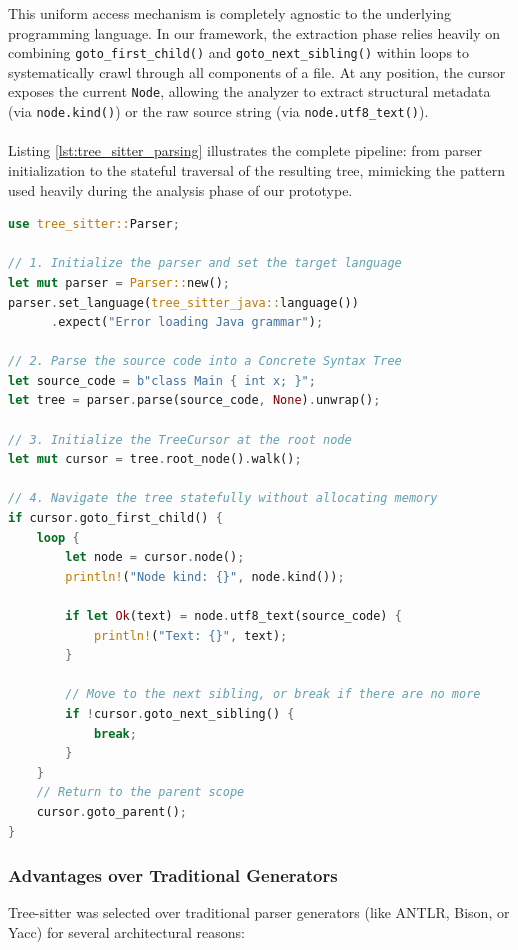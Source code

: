 This uniform access mechanism is completely agnostic to the underlying
programming language. In our framework, the extraction phase relies
heavily on combining \texttt{goto\_first\_child()} and
\texttt{goto\_next\_sibling()} within loops to systematically crawl
through all components of a file. At any position, the cursor exposes
the current \texttt{Node}, allowing the analyzer to extract structural
metadata (via \texttt{node.kind()}) or the raw source string (via
\texttt{node.utf8\_text()}).
\\\\
Listing \ref{lst:tree_sitter_parsing} illustrates the complete pipeline:
from parser initialization to the stateful traversal of the resulting
tree, mimicking the pattern used heavily during the analysis phase of
our prototype.

\begin{lstlisting}[language=Rust,caption={Complete example of parsing source code and navigating the CST using Tree-sitter in Rust.},label={lst:tree_sitter_parsing}]
use tree_sitter::Parser;

// 1. Initialize the parser and set the target language
let mut parser = Parser::new();
parser.set_language(tree_sitter_java::language())
      .expect("Error loading Java grammar");

// 2. Parse the source code into a Concrete Syntax Tree
let source_code = b"class Main { int x; }";
let tree = parser.parse(source_code, None).unwrap();

// 3. Initialize the TreeCursor at the root node
let mut cursor = tree.root_node().walk();

// 4. Navigate the tree statefully without allocating memory
if cursor.goto_first_child() {
    loop {
        let node = cursor.node();
        println!("Node kind: {}", node.kind());

        if let Ok(text) = node.utf8_text(source_code) {
            println!("Text: {}", text);
        }

        // Move to the next sibling, or break if there are no more
        if !cursor.goto_next_sibling() {
            break;
        }
    }
    // Return to the parent scope
    cursor.goto_parent();
}
\end{lstlisting}

\subsubsection{Advantages over Traditional Generators}
Tree-sitter was selected over traditional parser generators (like
ANTLR, Bison, or Yacc) \cite{ortin_empirical_2022} for several
architectural reasons:

